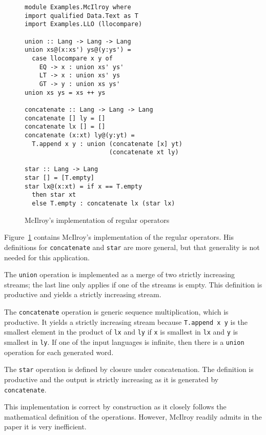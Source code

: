 \begin{figure}[btp]
\begin{lstlisting}
module Examples.McIlroy where
import qualified Data.Text as T
import Examples.LLO (llocompare)

union :: Lang -> Lang -> Lang
union xs@(x:xs') ys@(y:ys') =
  case llocompare x y of
    EQ -> x : union xs' ys'
    LT -> x : union xs' ys
    GT -> y : union xs ys'
union xs ys = xs ++ ys

concatenate :: Lang -> Lang -> Lang
concatenate [] ly = []
concatenate lx [] = []
concatenate (x:xt) ly@(y:yt) =
  T.append x y : union (concatenate [x] yt) 
                       (concatenate xt ly)

star :: Lang -> Lang
star [] = [T.empty]
star lx@(x:xt) = if x == T.empty
  then star xt
  else T.empty : concatenate lx (star lx)
\end{lstlisting}
\vspace{-\baselineskip}
  \caption{McIlroy's implementation of regular operators}
  \label{fig:regular-operators-0}
\end{figure}
Figure~\ref{fig:regular-operators-0} contains McIlroy's implementation
of the regular operators. His definitions for \lstinline{concatenate}
and \lstinline{star} are more general, but that generality is not
needed for this application.

The \lstinline{union} operation is
implemented as a merge of two strictly increasing streams; the last
line only applies if one of the streams is empty. This definition is
productive and yields a strictly increasing stream.

The \lstinline{concatenate} operation is generic
sequence multiplication, which is productive. It yields a strictly
increasing stream because \lstinline{T.append x y} is the smallest
element in the product of \lstinline{lx} and \lstinline{ly} if
\lstinline{x} is smallest in \lstinline{lx} and \lstinline{y} is
smallest in \lstinline{ly}. If one of the input languages is infinite, then there is
a \lstinline{union} operation for each generated word.

The \lstinline{star} operation is defined by closure under concatenation. The definition
is productive and the output is strictly increasing as it is generated by
\lstinline{concatenate}.

This implementation is correct by construction as it closely follows the mathematical
definition of the operations. However, McIlroy readily admits in the paper it is very
inefficient.

